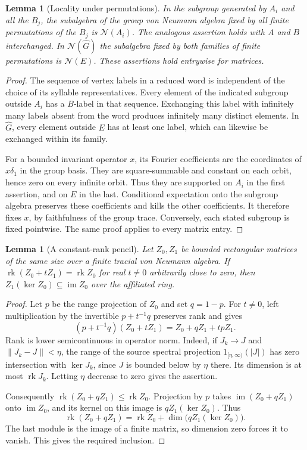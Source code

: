 \documentclass[11pt,a4paper,reqno]{amsart}
\numberwithin{equation}{section}
\newtheorem{lemma}[theorem]{Lemma}
\theoremstyle{remark}
\newcommand{\N}{\mathcal N}
\newcommand{\rk}{\operatorname{rk}}
\newcommand{\im}{\operatorname{im}}
\begin{document}
\begin{lemma}[Locality under permutations]\label{lem:permutation-locality}
In the subgroup generated by \(A_i\) and all the \(B_j\), the subalgebra of the group von Neumann algebra fixed by all finite permutations of the \(B_j\) is \(\N(A_i)\). The analogous assertion holds with \(A\) and \(B\) interchanged. In \(\N(\widehat G)\) the subalgebra fixed by both families of finite permutations is \(\N(E)\). These assertions hold entrywise for matrices.
\end{lemma}
\begin{proof}
The sequence of vertex labels in a reduced word is independent of the choice of its syllable representatives. Every element of the indicated subgroup outside \(A_i\) has a \(B\)-label in that sequence. Exchanging this label with infinitely many labels absent from the word produces infinitely many distinct elements. In \(\widehat G\), every element outside \(E\) has at least one label, which can likewise be exchanged within its family.

For a bounded invariant operator \(x\), its Fourier coefficients are the coordinates of \(x\delta_1\) in the group basis. They are square-summable and constant on each orbit, hence zero on every infinite orbit. Thus they are supported on \(A_i\) in the first assertion, and on \(E\) in the last. Conditional expectation onto the subgroup algebra preserves these coefficients and kills the other coefficients. It therefore fixes \(x\), by faithfulness of the group trace. Conversely, each stated subgroup is fixed pointwise. The same proof applies to every matrix entry.
\end{proof}

\begin{lemma}[A constant-rank pencil]\label{lem:rotation-tangent}
Let \(Z_0,Z_1\) be bounded rectangular matrices of the same size over a finite tracial von Neumann algebra. If \(\rk(Z_0+tZ_1)=\rk Z_0\) for real \(t\ne0\) arbitrarily close to zero, then \(Z_1(\ker Z_0)\subseteq\im Z_0\) over the affiliated ring.
\end{lemma}
\begin{proof}
Let \(p\) be the range projection of \(Z_0\) and set \(q=1-p\). For \(t\ne0\), left multiplication by the invertible \(p+t^{-1}q\) preserves rank and gives
\[
 (p+t^{-1}q)(Z_0+tZ_1)=Z_0+qZ_1+t p Z_1.
\]
Rank is lower semicontinuous in operator norm. Indeed, if \(J_k\to J\) and \(\|J_k-J\|<\eta\), the range of the source spectral projection \(1_{[\eta,\infty)}(|J|)\) has zero intersection with \(\ker J_k\), since \(J\) is bounded below by \(\eta\) there. Its dimension is at most \(\rk J_k\). Letting \(\eta\) decrease to zero gives the assertion.

Consequently \(\rk(Z_0+qZ_1)\le\rk Z_0\). Projection by \(p\) takes \(\im(Z_0+qZ_1)\) onto \(\im Z_0\), and its kernel on this image is \(qZ_1(\ker Z_0)\). Thus
\[
  \rk(Z_0+qZ_1)=\rk Z_0+\dim\bigl(qZ_1(\ker Z_0)\bigr).
\]
The last module is the image of a finite matrix, so dimension zero forces it to vanish. This gives the required inclusion.
\end{proof}
\end{document}
